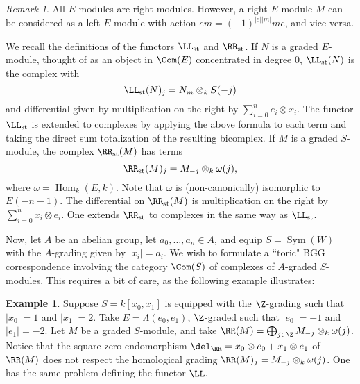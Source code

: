 \documentclass[12pt]{amsart}
\theoremstyle{definition}
\newtheorem{example}[lemma]{Example}
\theoremstyle{remark}
\newtheorem{rem}[lemma]{Remark}
\newcommand{\Hom}{\operatorname{Hom}} %
\newcommand{\Sym}{\operatorname{Sym}} %
\def\on{\operatorname}
\def\o{\omega}
\begin{document}
\begin{rem}
All $E$-modules are right modules. However, a right $E$-module $M$ can be considered as a left $E$-module with action $em = (-1)^{|e||m|}me$, and vice versa.
\end{rem}

We recall the definitions of the functors $\LL_{\on{st}}$ and $\RR_{\on{st}}$. If $N$ is a graded $E$-module, thought of as an object in $\Com(E)$ concentrated in degree 0, $\LL_{\on{st}}(N)$ is the complex with
$$
\LL_{\on{st}}(N)_j = N_m \otimes_k S(-j)
$$
and differential given by multiplication on the right by $\sum_{i = 0}^n e_i \otimes x_i$. The functor $\LL_{\on{st}}$ is extended to complexes by applying the above formula to each term and taking the direct sum totalization of the resulting bicomplex. If $M$ is a graded $S$-module, the complex $\RR_{\on{st}}(M)$ has terms
$$
\RR_{\on{st}}(M)_j = M_{-j} \otimes_k \o(j), 
$$
where $\o = \Hom_k(E, k)$. Note that $\o$ is (non-canonically) isomorphic to $E(-n-1)$. The differential on $\RR_{\on{st}}(M)$ is multiplication on the right by $ \sum_{i = 0}^n x_i \otimes e_i$. One extends $\RR_{\on{st}}$ to complexes in the same way as $\LL_{\on{st}}$. 




Now, let $A$ be an abelian group, let $a_0, \dots, a_n \in A$, and equip $S = \Sym(W)$ with the $A$-grading given by $|x_i| = a_i$. We wish to formulate a ``toric" BGG correspondence involving the category $\Com(S)$ of complexes of $A$-graded $S$-modules. This requires a bit of care, as the following example illustrates:

\begin{example}
\label{grading}
Suppose $S = k[x_0, x_1]$ is equipped with the $\Z$-grading such that $|x_0| = 1$ and $|x_1| = 2$. Take $E= \Lambda(e_0, e_1)$, $\Z$-graded such that $|e_0| = -1$ and $|e_1| = -2$. Let $M$ be a graded $S$-module, and take $\RR(M) = \bigoplus_{j \in \Z} M_{-j} \otimes_k \o(j)$. Notice that the square-zero endomorphism $\del_{\RR} = x_0 \otimes e_0 + x_1 \otimes e_1$ of $\RR(M)$ does not respect the homological grading $\RR(M)_j = M_{-j} \otimes_k \o(j)$. One has the same problem defining the functor $\LL$.
\end{example}
\end{document}
